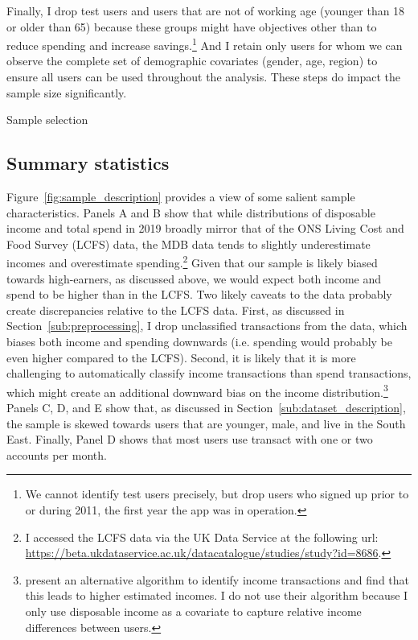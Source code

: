 Finally, I drop test users and users that are not of working age (younger than
18 or older than 65) because these groups might have objectives other than to
reduce spending and increase savings.\footnote{We cannot identify test users
    precisely, but drop users who signed up prior to or during 2011, the first
year the app was in operation.} And I retain only users for whom we can observe
the complete set of demographic covariates (gender, age, region) to ensure all
users can be used throughout the analysis. These steps do impact the sample
size significantly.

\begin{table}
\centering
\caption{Sample selection}\label{tab:selection}

\end{table}


\subsection{Summary statistics}%
\label{sub:summary_statistics}

Figure~\ref{fig:sample_description} provides a view of some salient sample
characteristics. Panels A and B show that while distributions of disposable
income and total spend in 2019 broadly mirror that of the ONS Living Cost and
Food Survey (LCFS) data, the MDB data tends to slightly underestimate incomes
and overestimate spending.\footnote{I accessed the LCFS data via the UK Data
Service at the following url:
\url{https://beta.ukdataservice.ac.uk/datacatalogue/studies/study?id=8686}.}
Given that our sample is likely biased towards high-earners, as discussed
above, we would expect both income and spend to be higher than in the LCFS. Two
likely caveats to the data probably create discrepancies relative to the LCFS
data. First, as discussed in Section~\ref{sub:preprocessing}, I drop
unclassified transactions from the data, which biases both income and spending
downwards (i.e. spending would probably be even higher compared to the LCFS).
Second, it is likely that it is more challenging to automatically classify
income transactions than spend transactions, which might create an additional
downward bias on the income distribution.\footnote{\citet{bourquin2020effects}
    present an alternative algorithm to identify income transactions and find
that this leads to higher estimated incomes. I do not use their algorithm
because I only use disposable income as a covariate to capture relative income
differences between users.} Panels C, D, and E show that, as discussed in
Section~\ref{sub:dataset_description}, the sample is skewed towards users that
are younger, male, and live in the South East. Finally, Panel D shows that most
users use transact with one or two accounts per month.

